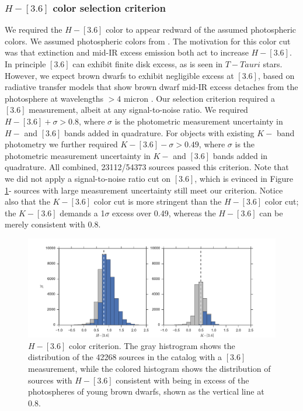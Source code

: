 \subsubsection{$H-[3.6]$ color selection criterion}
We required the $H-[3.6]$ color to appear redward of the assumed photospheric colors.  We assumed photospheric colors from \citet{2006ApJ...651..502P}.  The motivation for this color cut was that extinction and mid-IR excess emission both act to increase $H-[3.6]$.  In principle $[3.6]$ can exhibit finite disk excess, as is seen in $T-Tauri$ stars.  However, we expect brown dwarfs to exhibit negligible excess at $[3.6]$, based on radiative transfer models that show brown dwarf mid-IR excess detaches from the photosphere at wavelengths $>4$ micron \citep{2009MNRAS.394L.141E}.  Our selection criterion required a $[3.6]$ measurement, albeit at any signal-to-noise ratio.  We required $H-[3.6] + \sigma > 0.8$, where $\sigma$ is the photometric measurement uncertainty in $H-$ and $[3.6]$ bands added in quadrature.  For objects with existing $K-$ band photometry we further required $K-[3.6] - \sigma > 0.49$, where $\sigma$ is the photometric measurement uncertainty in $K-$ and $[3.6]$ bands added in quadrature.  All combined, 23112/54373 sources passed this criterion.  Note that we did not apply a signal-to-noise ratio cut on $[3.6]$, which is evinced in Figure \ref{fig_midIR_phot_sel}- sources with large measurement uncertainty still meet our criterion.  Notice also that the $K-[3.6]$ color cut is more stringent than the $H-[3.6]$ color cut; the $K-[3.6]$ demands a 1$\sigma$ excess over 0.49, whereas the $H-[3.6]$ can be merely consistent with 0.8.

\begin{figure}[ht!]
  \caption{$H-[3.6]$ color criterion.  The gray histrogram shows the distribution of the 42268 sources in the catalog with a $[3.6]$ measurement, while the colored histogram shows the distribution of sources with $H-[3.6]$ consistent with being in excess of the photospheres of young brown dwarfs, shown as the vertical line at 0.8.\label{fig_midIR_phot_sel}}
\centering
\includegraphics[scale=0.6]{chIMACS/figures/midIR_phot_sel}
\end{figure}



